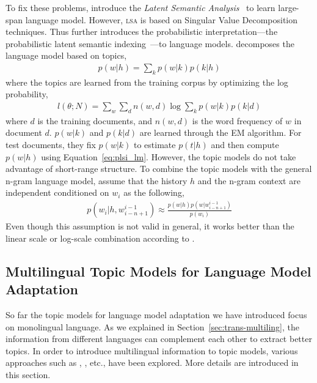 To fix these problems, \citet{Bellegarda-1997,Coccaro-1998} introduce the \emph{Latent Semantic Analysis}~\citep[\textsc{lsa}]{deerwester-90} to learn large-span language model. However, \textsc{lsa} is based on Singular Value Decomposition techniques. Thus \citet{Gildea-1999} further introduces the probabilistic interpretation---the probabilistic latent semantic indexing~\citep[\textsc{plsi}]{hoffman-99}---to language models. \citet{Gildea-1999} decomposes the language model based on topics,
\begin{align}
\label{eq:plsi_lm}
p(w|h) = \sum_k p(w|k) p(k|h)
\end{align}
where the topics are learned from the training corpus by optimizing the log probability,
\begin{align}
l(\theta; N) = \sum_w \sum_d n(w,d) \log \sum_k p(w|k) p(k|d)
\end{align}
where $d$ is the training documents, and $n(w,d)$ is the word frequency of $w$ in document $d$. $p(w|k)$ and $p(k|d)$ are learned through the EM algorithm. For test documents, they fix $p(w|k)$ to estimate $p(t|h)$ and then compute $p(w|h)$ using Equation~\ref{eq:plsi_lm}. However, the topic models do not take advantage of short-range structure. To combine the topic models with the general n-gram language model, \citet{Gildea-1999} assume that the history $h$ and the n-gram context are independent conditioned on $w_i$ as the following,
\begin{align}
p(w_i|h,w_{i-n+1}^{i-1}) \approx \frac{p(w|h)p(w|w_{i-n+1}^{i-1})}{p(w_i)}
\end{align}
Even though this assumption is not valid in general, it works better than the linear scale or log-scale combination according to \citet{Gildea-1999}.

\subsection{Multilingual Topic Models for Language Model Adaptation}

So far the topic models for language model adaptation we have introduced focus on monolingual language. As we explained in Section~\ref{sec:trans-multiling}, the information from different languages can complement each other to extract better topics. In order to introduce multilingual information to topic models, various approaches such as \cite{Tam-2007}, \cite{Ruiz-2011}, \cite{Yu-2013} etc., have been explored. More details are introduced in this section.

